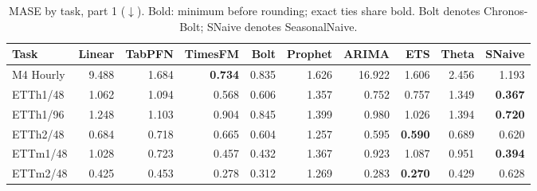 \begin{table}[!htbp]
\centering
\caption{MASE by task, part 1 ($\downarrow$). Bold: minimum before rounding; exact ties share bold. Bolt denotes Chronos-Bolt; SNaive denotes SeasonalNaive.}
\label{tab:mase1}
\small
\setlength{\tabcolsep}{3.5pt}
\begin{tabular}{lrrrrrrrrr}
\hline
Task & Linear & TabPFN & TimesFM & Bolt & Prophet & ARIMA & ETS & Theta & SNaive \\
\hline
M4 Hourly & 9.488 & 1.684 & \textbf{0.734} & 0.835 & 1.626 & 16.922 & 1.606 & 2.456 & 1.193 \\
ETTh1/48 & 1.062 & 1.094 & 0.568 & 0.606 & 1.357 & 0.752 & 0.757 & 1.349 & \textbf{0.367} \\
ETTh1/96 & 1.248 & 1.103 & 0.904 & 0.845 & 1.399 & 0.980 & 1.026 & 1.394 & \textbf{0.720} \\
ETTh2/48 & 0.684 & 0.718 & 0.665 & 0.604 & 1.257 & 0.595 & \textbf{0.590} & 0.689 & 0.620 \\
ETTm1/48 & 1.028 & 0.723 & 0.457 & 0.432 & 1.367 & 0.923 & 1.087 & 0.951 & \textbf{0.394} \\
ETTm2/48 & 0.425 & 0.453 & 0.278 & 0.312 & 1.269 & 0.283 & \textbf{0.270} & 0.429 & 0.628 \\
\hline
\end{tabular}
\end{table}
